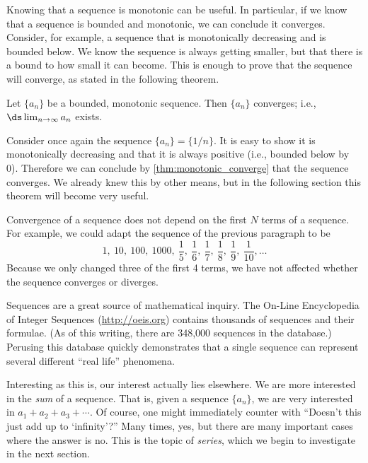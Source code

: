 Knowing that a sequence is monotonic can be useful. In particular, if we know that a sequence is bounded and monotonic, we can conclude it converges. Consider, for example, a sequence that is monotonically decreasing and is bounded below. We know the sequence is always getting smaller, but that there is a bound to how small it can become. This is enough to prove that the sequence will converge, as stated in the following theorem.

\begin{theorem}\label{thm:monotonic_converge}
Let $\{a_n\}$ be a bounded, monotonic sequence. Then $\{a_n\}$ converges; i.e., $\ds \lim_{n \to\infty}a_n$ exists.
\end{theorem}

Consider once again the sequence $\{a_n\} = \{1/n\}$. It is easy to show it is monotonically decreasing and that it is always positive (i.e., bounded below by 0). Therefore we can conclude by \autoref{thm:monotonic_converge} that the sequence converges. We already knew this by other means, but in the following section this theorem will become very useful.

Convergence of a sequence does not depend on the first $N$ terms of a sequence.  For example, we could adapt the sequence of the previous paragraph to be
\[
 1,\ 10,\ 100,\ 1000,\ \frac15,\ \frac16,\ \frac17,\ \frac18,\ \frac19,\ \frac1{10},
 \dotsc
\]
Because we only changed three of the first 4 terms, we have not affected whether the sequence converges or diverges.

Sequences are a great source of mathematical inquiry. The On-Line Encyclopedia of Integer Sequences (\url{http://oeis.org}) contains thousands of sequences and their formulae. (As of this writing, there are 348,000 sequences in the database.) Perusing this database quickly demonstrates that a single sequence can represent several different ``real life'' phenomena. 

Interesting as this is, our interest actually lies elsewhere. We are more interested in the \emph{sum} of a sequence. That is, given a sequence $\{a_n\}$, we are very interested in $a_1+a_2+a_3+\dotsb$. Of course, one might immediately counter with ``Doesn't this just add up to `infinity'?'' Many times, yes, but there are many important cases where the answer is no. This is the topic of \emph{series}, which we begin to investigate in the next section.


